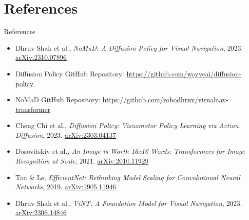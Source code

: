\documentclass{beamer}
\begin{document}
\section*{References}
\begin{frame}{References}
    \begin{itemize}
        \item Dhruv Shah et al., \textit{NoMaD: A Diffusion Policy for Visual Navigation}, 2023. \href{https://arxiv.org/abs/2310.07896}{arXiv:2310.07896}
        
        \item Diffusion Policy GitHub Repository: \href{https://github.com/wayveai/diffusion-policy}{https://github.com/wayveai/diffusion-policy}
        
        \item NoMaD GitHub Repository: \href{https://github.com/robodhruv/visualnav-transformer}{https://github.com/robodhruv/visualnav-transformer}
        
        \item Cheng Chi et al., \textit{Diffusion Policy: Visuomotor Policy Learning via Action Diffusion}, 2023. \href{https://arxiv.org/abs/2303.04137}{arXiv:2303.04137}
        
        \item Dosovitskiy et al., \textit{An Image is Worth 16x16 Words: Transformers for Image Recognition at Scale}, 2021. \href{https://arxiv.org/abs/2010.11929}{arXiv:2010.11929}
        
        \item Tan \& Le, \textit{EfficientNet: Rethinking Model Scaling for Convolutional Neural Networks}, 2019. \href{https://arxiv.org/abs/1905.11946}{arXiv:1905.11946}
        
        \item Dhruv Shah et al., \textit{ViNT: A Foundation Model for Visual Navigation}, 2023. \href{https://arxiv.org/abs/2306.14846}{arXiv:2306.14846}
    \end{itemize}
\end{frame}
\end{document}
